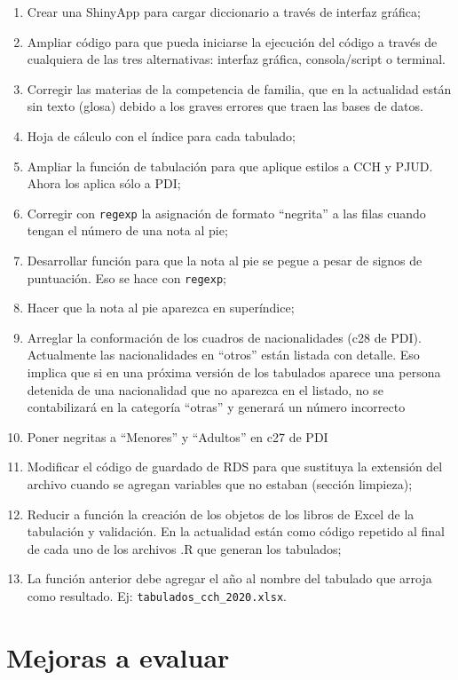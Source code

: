 \documentclass[
  spanish,
]{book}
\begin{document}
\begin{enumerate}
\def\labelenumi{\arabic{enumi}.}
\item
  Crear una ShinyApp para cargar diccionario a través de interfaz gráfica;
\item
  Ampliar código para que pueda iniciarse la ejecución del código a través de cualquiera de las tres alternativas: interfaz gráfica, consola/script o terminal.
\item
  Corregir las materias de la competencia de familia, que en la actualidad están sin texto (glosa) debido a los graves errores que traen las bases de datos.
\item
  Hoja de cálculo con el índice para cada tabulado;
\item
  Ampliar la función de tabulación para que aplique estilos a CCH y PJUD. Ahora los aplica sólo a PDI;
\item
  Corregir con \texttt{regexp} la asignación de formato ``negrita'' a las filas cuando tengan el número de una nota al pie;
\item
  Desarrollar función para que la nota al pie se pegue a pesar de signos de puntuación. Eso se hace con \texttt{regexp};
\item
  Hacer que la nota al pie aparezca en superíndice;
\item
  Arreglar la conformación de los cuadros de nacionalidades (c28 de PDI). Actualmente las nacionalidades en ``otros'' están listada con detalle. Eso implica que si en una próxima versión de los tabulados aparece una persona detenida de una nacionalidad que no aparezca en el listado, no se contabilizará en la categoría ``otras'' y generará un número incorrecto
\item
  Poner negritas a ``Menores'' y ``Adultos'' en c27 de PDI
\item
  Modificar el código de guardado de RDS para que sustituya la extensión del archivo cuando se agregan variables que no estaban (sección limpieza);
\item
  Reducir a función la creación de los objetos de los libros de Excel de la tabulación y validación. En la actualidad están como código repetido al final de cada uno de los archivos .R que generan los tabulados;
\item
  La función anterior debe agregar el año al nombre del tabulado que arroja como resultado. Ej: \texttt{tabulados\_cch\_2020.xlsx}.
\end{enumerate}

\hypertarget{mejoras-a-evaluar}{%
\section*{Mejoras a evaluar}\label{mejoras-a-evaluar}}
\end{document}
